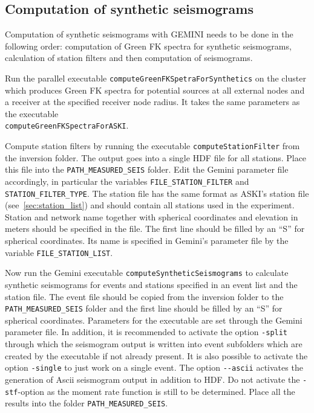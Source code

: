 \subsection{Computation of synthetic seismograms}
%
 Computation of synthetic seismograms with GEMINI needs to be done in the following order: computation of Green FK spectra for synthetic seismograms, calculation of station filters and then computation of seismograms.

 Run the parallel executable \verb+computeGreenFKSpetraForSynthetics+ on the cluster which produces Green FK spectra for potential sources at all external nodes and a receiver at the specified receiver node radius. It takes the same parameters as the executable \\ \verb+computeGreenFKSpectraForASKI+.

  Compute station filters by running the executable \verb+computeStationFilter+ from the inversion folder. The output goes into a single HDF file for all stations. Place this file into the \verb+PATH_MEASURED_SEIS+ folder. Edit the Gemini parameter file accordingly, in particular the variables \verb+FILE_STATION_FILTER+ and \verb+STATION_FILTER_TYPE+. The station file has the same format as ASKI's station file (see~\ref{sec:station_list}) and should contain all stations used in the experiment. Station and network name together with spherical coordinates and elevation in meters should be specified in the file. The first line should be filled by an ``S'' for spherical coordinates. Its name is specified in Gemini's parameter file by the variable \verb+FILE_STATION_LIST+.

  Now run the Gemini executable \verb+computeSyntheticSeismograms+ to calculate synthetic seismograms for events and stations specified in an event list and the station file. The event file should be copied from the inversion folder to the \verb+PATH_MEASURED_SEIS+ folder and the first line should be filled by an ``S'' for spherical coordinates. Parameters for the executable are set through the Gemini parameter file. In addition, it is recommended to activate the option \verb+-split+ through which the seismogram output is written into event subfolders which are created by the executable if not already present. It is also possible to activate the option \verb+-single+ to just work on a single event. The option \verb+--ascii+ activates the generation of Ascii seismogram output in addition to HDF. Do not activate the \verb+-stf+-option as the moment rate function is still to be determined. Place all the results into the folder \verb+PATH_MEASURED_SEIS+.

